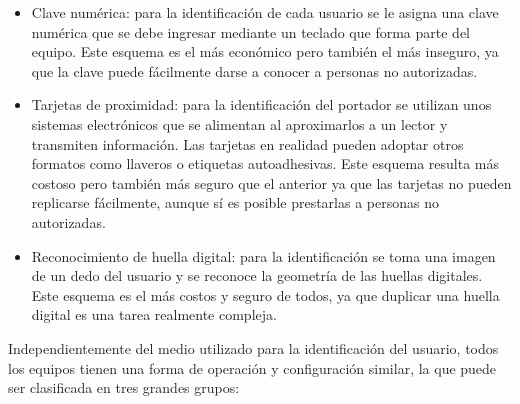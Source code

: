 \begin{itemize}
	\item Clave numérica: para la identificación de cada usuario se le asigna una clave numérica que se debe ingresar mediante un teclado que forma parte del equipo. Este esquema es el más económico pero también el más inseguro, ya que la clave puede fácilmente darse a conocer a personas no autorizadas. 
	\item Tarjetas de proximidad: para la identificación del portador se utilizan unos sistemas electrónicos que se alimentan al aproximarlos a un lector y transmiten información. Las tarjetas en realidad pueden adoptar otros formatos como llaveros o etiquetas autoadhesivas. Este esquema resulta más costoso pero también más seguro que el anterior ya que las tarjetas no pueden replicarse fácilmente, aunque sí es posible prestarlas a personas no autorizadas.
	\item Reconocimiento de huella digital: para la identificación se toma una imagen de un dedo del usuario y se reconoce la geometría de las huellas digitales. Este esquema es el más costos y seguro de todos, ya que duplicar una huella digital es una tarea realmente compleja.
\end{itemize}

Independientemente del medio utilizado para la identificación del usuario, todos los equipos tienen una forma de operación y configuración similar, la que puede ser clasificada en tres grandes grupos:

